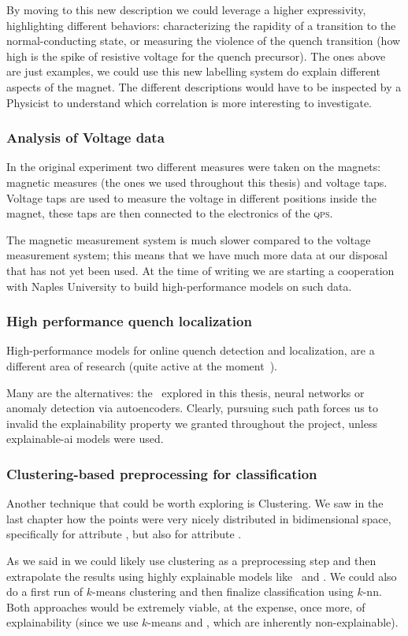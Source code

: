 By moving to this new description we could leverage a higher expressivity, highlighting different
behaviors: characterizing the rapidity of a transition to the normal-conducting state, or measuring
the violence of the quench transition (how high is the spike of resistive voltage for the quench
precursor). The ones above are just examples, we could use this new labelling system do explain
different aspects of the magnet. The different descriptions would have to be inspected by a
Physicist to understand which correlation is more interesting to investigate.

\subsubsection{Analysis of Voltage data}
In the original experiment two different measures were taken on the magnets: magnetic measures (the
ones we used throughout this thesis) and voltage taps. Voltage taps are used to measure the voltage
in different positions inside the magnet, these taps are then connected to the electronics of the
\textsc{qps}.

The magnetic measurement system is much slower compared to the voltage measurement system; this
means that we have much more data at our disposal that has not yet been used. At the time of writing
we are starting a cooperation with Naples University to build high-performance models on such data.

\subsubsection{High performance quench localization}
High-performance models for online quench detection and localization, are a different area of
research (quite active at the moment~\cite{hoang2021, zhou2021, einstein2023}).

Many are the alternatives: the \svcs\ explored in this thesis, neural networks or anomaly detection
via autoencoders. Clearly, pursuing such path forces us to invalid the explainability property we
granted throughout the project, unless explainable-ai models were used.

\subsubsection{Clustering-based preprocessing for classification}
Another technique that could be worth exploring is Clustering. We saw in the last chapter how the
points were very nicely distributed in bidimensional space, specifically for attribute \an, but also
for attribute \cnmod.

As we said in  we could likely use clustering as a preprocessing step and then
extrapolate the results using highly explainable models like \dts\ and \rfs. We could also do a
first run of $k$-means clustering and then finalize classification using $k$-nn. Both approaches
would be extremely viable, at the expense, once more, of explainability (since we use $k$-means and
\pca, which are inherently non-explainable).




